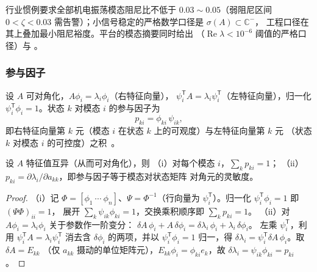 \begin{remark}[工程稳定口径]
行业惯例要求全部机电振荡模态阻尼比不低于 $0.03\sim0.05$（弱阻尼区间
$0<\zeta<0.03$ 需告警）；小信号稳定的严格数学口径是 $\sigma(A)\subset\mathbb C^-$，
工程口径在其上叠加最小阻尼裕度。平台的模态摘要同时给出 
（$\operatorname{Re}\lambda<10^{-6}$ 阈值的严格口径）与
。
\end{remark}

\subsubsection{参与因子}

\begin{definition}[参与因子]\label{sec:dy-th-ctl-def-pf}
设 $A$ 可对角化，$A\phi_i=\lambda_i\phi_i$（右特征向量），
$\psi_i^{\mathsf T}A=\lambda_i\psi_i^{\mathsf T}$（左特征向量），归一化
$\psi_i^{\mathsf T}\phi_i=1$。状态 $k$ 对模态 $i$ 的参与因子为
\begin{equation}
p_{ki}=\phi_{ki}\,\psi_{ik},
\label{sec:dy-th-ctl-eq-pf}
\end{equation}
即右特征向量第 $k$ 元（模态 $i$ 在状态 $k$ 上的可观度）与左特征向量第 $k$ 元
（状态 $k$ 对模态 $i$ 的可控度）之积~\cite{ctl:perez-arriaga}。
\end{definition}

\begin{theorem}[参与因子的基本性质]\label{sec:dy-th-ctl-thm-pf}
设 $A$ 特征值互异（从而可对角化），则
（i）对每个模态 $i$，$\sum_k p_{ki}=1$；
（ii）$p_{ki}=\partial\lambda_i/\partial a_{kk}$，即参与因子等于模态对状态矩阵
对角元的灵敏度。
\end{theorem}

\begin{proof}
（i）记 $\Phi=[\phi_1\ \cdots\ \phi_n]$、$\Psi=\Phi^{-1}$（行向量为
$\psi_i^{\mathsf T}$）。归一化 $\psi_i^{\mathsf T}\phi_i=1$ 即 $(\Psi\Phi)_{ii}=1$，
展开 $\sum_k\psi_{ik}\phi_{ki}=1$，交换乘积顺序即 $\sum_k p_{ki}=1$。
（ii）对 $A\phi_i=\lambda_i\phi_i$ 关于参数作一阶变分：
$\delta A\,\phi_i+A\,\delta\phi_i=\delta\lambda_i\,\phi_i+\lambda_i\,\delta\phi_i$。
左乘 $\psi_i^{\mathsf T}$，利用 $\psi_i^{\mathsf T}A=\lambda_i\psi_i^{\mathsf T}$
消去含 $\delta\phi_i$ 的两项，并以 $\psi_i^{\mathsf T}\phi_i=1$ 归一，得
$\delta\lambda_i=\psi_i^{\mathsf T}\delta A\,\phi_i$。取 $\delta A=E_{kk}$
（仅 $a_{kk}$ 摄动的单位矩阵元），$E_{kk}\phi_i=\phi_{ki}e_k$，故
$\delta\lambda_i=\psi_{ik}\phi_{ki}=p_{ki}$。
\end{proof}

